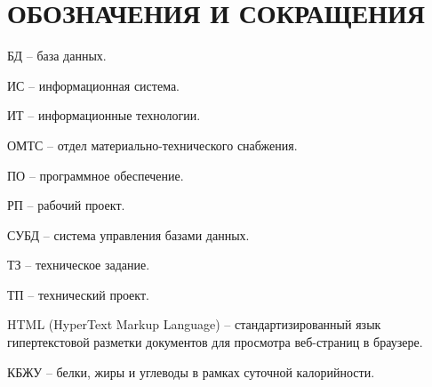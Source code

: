 \section*{ОБОЗНАЧЕНИЯ И СОКРАЩЕНИЯ}

БД -- база данных.

ИС -- информационная система.

ИТ -- информационные технологии. 

ОМТС -- отдел материально-технического снабжения. 

ПО -- программное обеспечение.

РП -- рабочий проект.

СУБД -- система управления базами данных.

ТЗ -- техническое задание.

ТП -- технический проект.

HTML (HyperText Markup Language) -- стандартизированный язык гипертекстовой разметки документов для просмотра веб-страниц в браузере.

КБЖУ -- белки, жиры и углеводы в рамках суточной калорийности.
